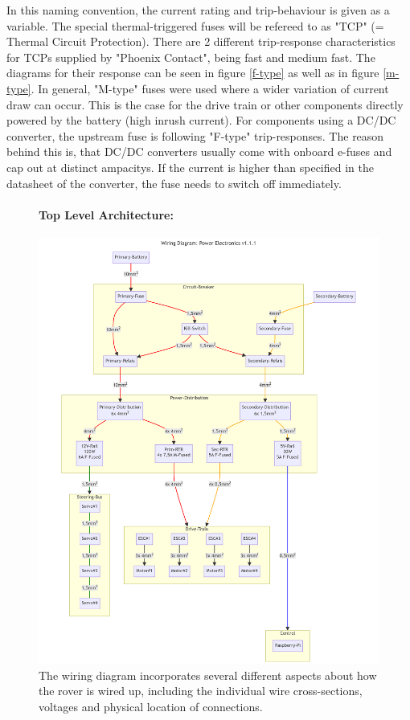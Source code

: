     In this naming convention, the current rating and trip-behaviour is given as a variable. The special thermal-triggered fuses will be refereed to as "TCP" (= Thermal Circuit Protection). There are 2 different trip-response characteristics for TCPs supplied by "Phoenix Contact", being fast and medium fast. The diagrams for their response can be seen in figure \ref{f-type} as well as in figure \ref{m-type}. In general, "M-type" fuses were used where a wider variation of current draw can occur. This is the case for the drive train or other components directly powered by the battery (high inrush current). For components using a DC/DC converter, the upstream fuse is following "F-type" trip-responses. The reason behind this is, that DC/DC converters usually come with onboard e-fuses and cap out at distinct ampacitys. If the current is higher than specified in the datasheet of the converter, the fuse needs to switch off immediately. 

    \clearpage %

    \begin{figure}[ht!] %
        \paragraph{Top Level Architecture:}
        \centering
        \includegraphics[width=1\textwidth]{contents/figures/wiring-diagram-p-v1.1.1.png}
        \caption{The wiring diagram incorporates several different aspects about how the rover is wired up, including the individual wire cross-sections, voltages and physical location of connections.}
        \label{wiring_diagram}
    \end{figure}

